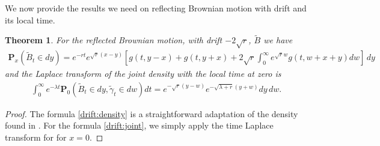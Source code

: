 \documentclass[11pt,a4paper]{article}
\newtheorem{theorem}{Theorem}
\theoremstyle{definition}
\theoremstyle{remark}
\begin{document}
We now provide the results we need on reflecting Brownian motion with drift and its local time.
\begin{theorem}
	For the reflected Brownian motion, with drift $-2\sqrt{r}$, $\widetilde{B}$ we have
	\begin{align}
		\label{drift:density}
		\mathbf{P}_x(\widetilde{B}_t \in dy)= e^{-rt} e^{\sqrt{r}(x-y)} [g(t, y-x) + g(t, y+x) + 2 \sqrt{r} \int_0^\infty e^{\sqrt{r} w} g(t, w+x+y) dw] \, dy
	\end{align}
	and the Laplace transform of the joint density with the local time at zero is
	\begin{align}
		\label{drift:joint}
		\int_0^\infty e^{-\lambda t} \mathbf{P}_0(\widetilde{B}_t \in dy, \widetilde{\gamma}_t \in dw) dt = e^{-\sqrt{r} (y-w)} e^{- \sqrt{\lambda + r}(y+w) } dy \, dw.
	\end{align}
\end{theorem}
\begin{proof}
	The formula \eqref{drift:density} is a straightforward adaptation of the density found in \cite[Appendix 1, Section 16]{BorodinSalminen}.
	For the formula \eqref{drift:joint}, we simply apply the time Laplace transform for \cite[Formula 1.3.8, page 254]{BorodinSalminen} for \(x=0\).
\end{proof}
\end{document}
